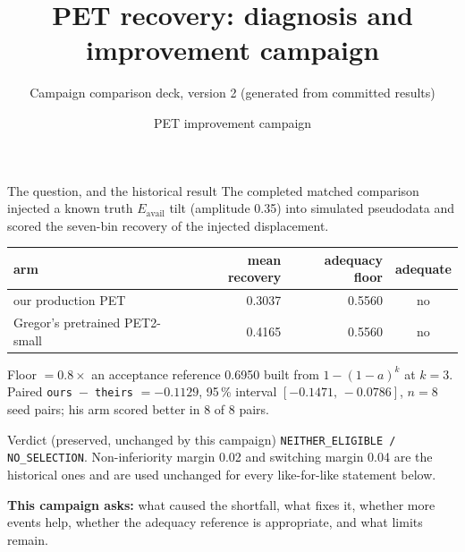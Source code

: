 \documentclass[aspectratio=169,10pt]{beamer}
\title{PET recovery: diagnosis and improvement campaign}
\subtitle{Campaign comparison deck, version 2 (generated from committed results)}
\author{PET improvement campaign}
\date{\parbox{0.8\linewidth}{\centering\small PET is diagnostic method development. Nothing here is a publication adoption, and nothing here changes the historical comparison's verdict or thresholds.}}
\def\evidencetext{}
\begin{document}
\gdef\evidencetext{}
\frame{\titlepage}

\gdef\evidencetext{\texttt{../configuration\_comparison/campaign\_report.json}}
\begin{frame}{The question, and the historical result}
The completed matched comparison injected a known truth $E_{\mathrm{avail}}$ tilt (amplitude 0.35)
into simulated pseudodata and scored the seven-bin recovery of the injected displacement.
\begin{center}
{\small
\begin{tabular}{lrrc}
\toprule
arm & mean recovery & adequacy floor & adequate \\
\midrule
our production PET & 0.3037 & 0.5560 & no \\
Gregor's pretrained PET2-small & 0.4165 & 0.5560 & no \\
\bottomrule
\end{tabular}}
\end{center}
Floor $= 0.8\times$ an acceptance reference 0.6950 built from $1-(1-a)^k$ at $k=3$.
Paired \texttt{ours $-$ theirs} $= \ensuremath{-}0.1129$, 95\,\% interval $[\ensuremath{-}0.1471,\,\ensuremath{-}0.0786]$, $n=8$ seed pairs;
his arm scored better in 8 of 8 pairs.
\begin{block}{Verdict (preserved, unchanged by this campaign)}
\texttt{NEITHER\_ELIGIBLE / NO\_SELECTION}. Non-inferiority margin 0.02 and switching margin 0.04 are the historical
ones and are used unchanged for every like-for-like statement below.
\end{block}
\textbf{This campaign asks:} what caused the shortfall, what fixes it, whether more events help,
whether the adequacy reference is appropriate, and what limits remain.
\end{frame}
\end{document}
